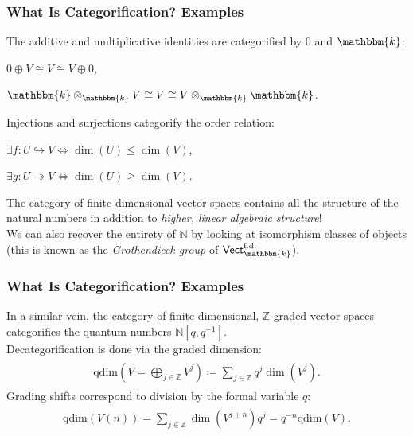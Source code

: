\documentclass{beamer}
\newcommand*{\emphasis}[1]{\textcolor{structure}{\em #1}}
\begin{document}
\begin{frame}
\frametitle{What Is Categorification? Examples}
The additive and multiplicative identities are categorified by $0$ and $\mathbbm{k}$:
\begin{center}$0 \oplus V \cong V \cong V \oplus 0$,\end{center}
\begin{center}$\mathbbm{k} \otimes_\mathbbm{k} V \cong V \cong V \otimes_\mathbbm{k} \mathbbm{k}$.\end{center}
Injections and surjections categorify the order relation:
\begin{center}$\exists f : U \hookrightarrow V \iff \dim(U) \leq \dim(V)$,\end{center}
\begin{center}$\exists g : U \twoheadrightarrow V \iff \dim(U) \geq \dim(V)$.\end{center}
The category of finite-dimensional vector spaces contains all the structure of the natural numbers in addition to \emphasis{higher, linear algebraic structure}!\\[2ex]
We can also recover the entirety of $\mathbb{N}$ by looking at isomorphism classes of objects (this is known as the \emphasis{Grothendieck group} of $\textsf{Vect}^\text{f.d.}_\mathbbm{k}$).
\end{frame}

\begin{frame}
\frametitle{What Is Categorification? Examples}
In a similar vein, the category of finite-dimensional, $\mathbb{Z}$-graded vector spaces categorifies the quantum numbers $\mathbb{N}[q, q^{-1}]$.\\[2ex] Decategorification is done via the graded dimension:
\begin{align*}
\begin{split}
\mathrm{qdim}\!\left(V = \bigoplus_{j \in \mathbb{Z}}{V^j}\right) \coloneqq \sum_{j \in \mathbb{Z}}{q^j\dim(V^j)}.
\end{split}
\end{align*}
Grading shifts correspond to division by the formal variable $q$:
\begin{align*}
\begin{split}
\mathrm{qdim}\!\left(V(n)\right) = \sum_{j \in \mathbb{Z}}{\dim(V^{j+n})q^j} = q^{-n}\mathrm{qdim}\!\left(V\right).
\end{split}
\end{align*}
\end{frame}
\end{document}
